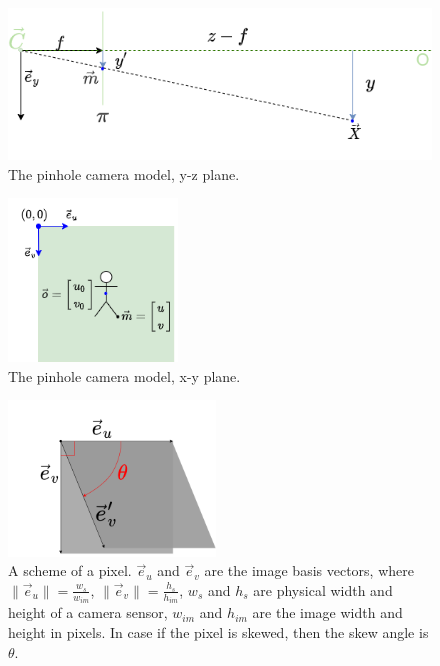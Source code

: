 \begin{figure}[ht]
    \centering
    \includegraphics[width=\textwidth]{graphics/td_scene_yz.png}
    \caption{The pinhole camera model, y-z plane.}
    \label{fig:td_scene_yz}
\end{figure}

\begin{figure}[ht]
  \centering
  \includegraphics[width=0.4\textwidth]{graphics/td_scene_xy.png}
  \caption{The pinhole camera model, x-y plane.}
  \label{fig:td_scene_xy}
\end{figure}

\begin{figure}[ht]
  \centering
  \includegraphics[width=0.49\textwidth]{graphics/pixel.png}
  \caption[A scheme of a pixel skew.]{A scheme of a pixel. $\vec{e}_u$ and $\vec{e}_v$ are the image basis vectors, where $\lVert \vec{e}_u \rVert = \frac{w_s}{w_{im}}$, $\lVert \vec{e}_v \rVert = \frac{h_s}{h_{im}}$, $w_s$ and $h_s$ are physical width and height of a camera sensor, $w_{im}$ and $h_{im}$ are the image width and height in pixels. In case if the pixel is skewed, then the skew angle is $\theta$.}
  \label{fig:Kframes}
\end{figure}

